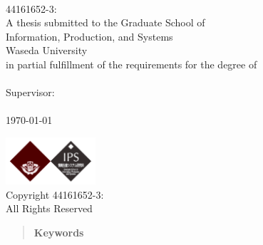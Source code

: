 \documentclass[11pt,
            english,
            twoside,
            liststotoc,
            singlespacing,
            headsepline,
            consistentlayout]{style}
\theoremstyle{definition}
\begin{document}
\begin{titlepage}
\begin{center}
\thispagestyle{empty}
\vspace*{.02\textheight}
{\ttitle} \\[2.5cm] %
{44161652-3: \authorname} \\[2.5cm] %
{
    A thesis submitted to the Graduate School of \\
    Information, Production, and Systems\\
    Waseda University\\
    in partial fulfillment of the requirements for the degree of
} \\[1.2cm]

{\degreename} \\[2.5cm]
{Supervisor: \supname} \vfill
{\deptname}\\[1.0cm]
{\univname}\\[1.0cm]
{\today} \vfill

\includegraphics[width=0.25\textwidth]{wasedaLogo}\\[0.1cm]
{Copyright  44161652-3: \authorname} \\[0.2cm]
All Rights Reserved
\end{center}
\end{titlepage}



\begin{abstract}
\addchaptertocentry{\abstractname} %



\vfill
\noindent \textbf{Keywords}\textemdash\keywordnames
\end{abstract}

\end{document}
